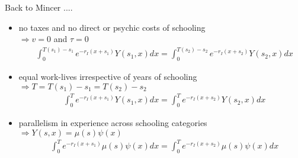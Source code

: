 \begin{frame}
Back to Mincer ....

\begin{itemize}
\item no taxes and no direct or psychic costs of schooling \\\vspace{0.3cm}
\hspace{0.3cm}$\Rightarrow v = 0$ and $\tau = 0$\vspace{0.3cm}
\begin{align*}
&\int_{0}^{T(s_1) - s_1} e^{-r_I(x + s_1)}Y(s_1, x) dx  = \int_{0}^{T(s_2) - s_2} e^{-r_I(x + s_2)}Y(s_2, x) dx
\end{align*}
\end{itemize}\end{frame}
\begin{frame}
\begin{itemize}
\item equal work-lives irrespective of years of schooling \\\vspace{0.3cm}
\hspace{0.3cm}$\Rightarrow T = T(s_1) - s_1 = T(s_2) - s_2$\vspace{0.3cm}
\begin{align*}
&\int_{0}^T e^{-r_I(x + s_1)}Y(s_1, x) dx  = \int_{0}^T e^{-r_I(x + s_2)}Y(s_2, x) dx
\end{align*}
\end{itemize}
\end{frame}
\begin{frame}
\begin{itemize}
\item parallelism in experience across schooling categories \\\vspace{0.3cm}
\hspace{0.3cm}$\Rightarrow Y(s, x) = \mu(s)\psi(x)$\vspace{0.3cm}
\begin{align*}
&\int_{0}^T e^{-r_I(x + s_1)} \mu(s)\psi(x) dx  = \int_{0}^T e^{-r_I(x + s_2)} \mu(s)\psi(x)dx
\end{align*}
\end{itemize}
\end{frame}
